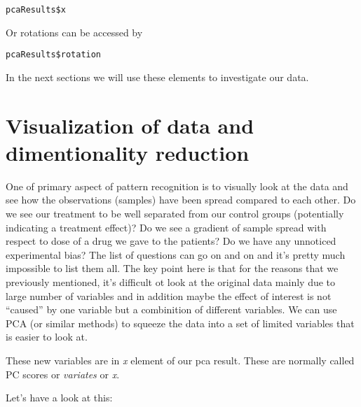 \documentclass[
]{book}
\newenvironment{Shaded}{\begin{snugshade}}{\end{snugshade}}
\newcommand{\CommentTok}[1]{\textcolor[rgb]{0.56,0.35,0.01}{\textit{#1}}}
\newcommand{\DataTypeTok}[1]{\textcolor[rgb]{0.13,0.29,0.53}{#1}}
\newcommand{\DecValTok}[1]{\textcolor[rgb]{0.00,0.00,0.81}{#1}}
\newcommand{\KeywordTok}[1]{\textcolor[rgb]{0.13,0.29,0.53}{\textbf{#1}}}
\newcommand{\NormalTok}[1]{#1}
\newcommand{\OperatorTok}[1]{\textcolor[rgb]{0.81,0.36,0.00}{\textbf{#1}}}
\newcommand{\StringTok}[1]{\textcolor[rgb]{0.31,0.60,0.02}{#1}}
\theoremstyle{definition}
\theoremstyle{definition}
\theoremstyle{definition}
\theoremstyle{remark}
\begin{document}
\begin{verbatim}
pcaResults$x
\end{verbatim}

Or rotations can be accessed by

\begin{verbatim}
pcaResults$rotation
\end{verbatim}

In the next sections we will use these elements to investigate our data.

\hypertarget{pcavisdimreduct}{%
\section{Visualization of data and dimentionality reduction}\label{pcavisdimreduct}}

One of primary aspect of pattern recognition is to visually look at the data and see how the observations (samples) have been spread compared to each other. Do we see our treatment to be well separated from our control groups (potentially indicating a treatment effect)? Do we see a gradient of sample spread with respect to dose of a drug we gave to the patients? Do we have any unnoticed experimental bias? The list of questions can go on and on and it's pretty much impossible to list them all. The key point here is that for the reasons that we previously mentioned, it's difficult ot look at the original data mainly due to large number of variables and in addition maybe the effect of interest is not ``caused'' by one variable but a combinition of different variables. We can use PCA (or similar methods) to squeeze the data into a set of limited variables that is easier to look at.

These new variables are in \emph{x} element of our pca result. These are normally called PC scores or \emph{variates} or \emph{x}.

Let's have a look at this:

\begin{Shaded}
\end{Shaded}
\end{document}
